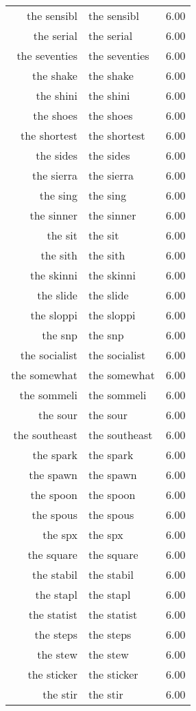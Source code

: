\begin{table}[ht]
\begin{tabular}{rlr}
  the sensibl & the sensibl & 6.00 \\ 
  the serial & the serial & 6.00 \\ 
  the seventies & the seventies & 6.00 \\ 
  the shake & the shake & 6.00 \\ 
  the shini & the shini & 6.00 \\ 
  the shoes & the shoes & 6.00 \\ 
  the shortest & the shortest & 6.00 \\ 
  the sides & the sides & 6.00 \\ 
  the sierra & the sierra & 6.00 \\ 
  the sing & the sing & 6.00 \\ 
  the sinner & the sinner & 6.00 \\ 
  the sit & the sit & 6.00 \\ 
  the sith & the sith & 6.00 \\ 
  the skinni & the skinni & 6.00 \\ 
  the slide & the slide & 6.00 \\ 
  the sloppi & the sloppi & 6.00 \\ 
  the snp & the snp & 6.00 \\ 
  the socialist & the socialist & 6.00 \\ 
  the somewhat & the somewhat & 6.00 \\ 
  the sommeli & the sommeli & 6.00 \\ 
  the sour & the sour & 6.00 \\ 
  the southeast & the southeast & 6.00 \\ 
  the spark & the spark & 6.00 \\ 
  the spawn & the spawn & 6.00 \\ 
  the spoon & the spoon & 6.00 \\ 
  the spous & the spous & 6.00 \\ 
  the spx & the spx & 6.00 \\ 
  the square & the square & 6.00 \\ 
  the stabil & the stabil & 6.00 \\ 
  the stapl & the stapl & 6.00 \\ 
  the statist & the statist & 6.00 \\ 
  the steps & the steps & 6.00 \\ 
  the stew & the stew & 6.00 \\ 
  the sticker & the sticker & 6.00 \\ 
  the stir & the stir & 6.00 \\ 

\end{tabular}
\end{table}
